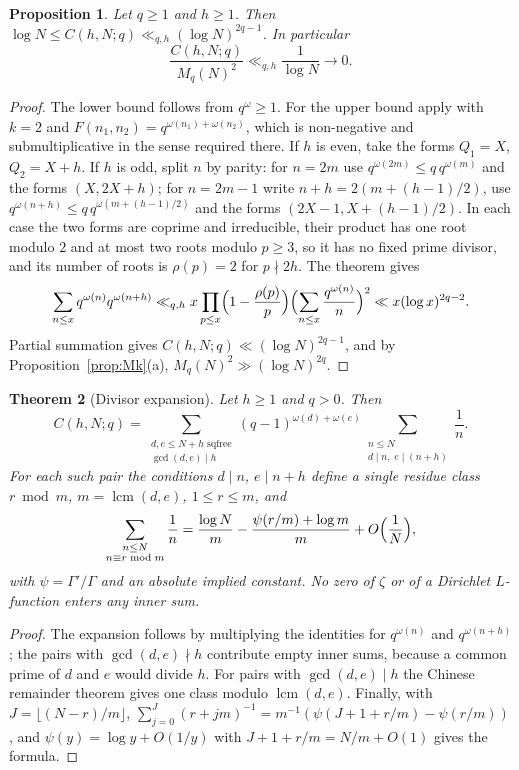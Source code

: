 \documentclass[11pt]{amsart}
\newtheorem{theorem}{Theorem}[section]
\newtheorem{proposition}[theorem]{Proposition}
\theoremstyle{definition}
\theoremstyle{remark}
\newcommand{\om}{\omega}
\begin{document}
\begin{proposition}\label{prop:limit}
  Let $q\ge1$ and $h\ge1$.  Then $\log N\le C(h,N;q)\ll_{q,h}(\log N)^{2q-1}$.  In particular
  \[
    \frac{C(h,N;q)}{M_q(N)^2}\ll_{q,h}\frac1{\log N}\longrightarrow0 .
  \]
\end{proposition}
\begin{proof}
  The lower bound follows from $q^{\om}\ge1$.  For the upper bound apply
  \cite[Thm.~1]{NT98} with $k=2$ and $F(n_1,n_2)=q^{\om(n_1)+\om(n_2)}$, which is
  non-negative and submultiplicative in the sense required there.  If $h$ is even, take the
  forms $Q_1=X$, $Q_2=X+h$.  If $h$ is odd, split $n$ by parity: for $n=2m$ use
  $q^{\om(2m)}\le q\,q^{\om(m)}$ and the forms $(X,2X+h)$; for $n=2m-1$ write
  $n+h=2(m+(h-1)/2)$, use $q^{\om(n+h)}\le q\,q^{\om(m+(h-1)/2)}$ and the forms
  $(2X-1,X+(h-1)/2)$.  In each case the two forms are coprime and irreducible, their product
  has one root modulo $2$ and at most two roots modulo $p\ge3$, so it has no fixed prime
  divisor, and its number of roots is $\rho(p)=2$ for $p\nmid2h$.  The theorem gives
  \[
    \sum_{n\le x}q^{\om(n)}q^{\om(n+h)}\ll_{q,h} x\prod_{p\le x}\Bigl(1-\frac{\rho(p)}p\Bigr)
    \Bigl(\sum_{n\le x}\frac{q^{\om(n)}}{n}\Bigr)^2\ll x(\log x)^{2q-2}.
  \]
  Partial summation gives $C(h,N;q)\ll(\log N)^{2q-1}$, and by
  Proposition~\ref{prop:Mk}(a), $M_q(N)^2\gg(\log N)^{2q}$.
\end{proof}

\begin{theorem}[Divisor expansion]\label{thm:error}
  Let $h\ge1$ and $q>0$.  Then
  \begin{equation}\label{eq:Aq}
    C(h,N;q) = \sum_{\substack{d,e\le N+h\text{ sqfree}\\\gcd(d,e)\mid h}}
               (q-1)^{\om(d)+\om(e)}
               \!\!\!\sum_{\substack{n\le N\\d\mid n,\;e\mid(n+h)}}\!\!\!\frac{1}{n}.
  \end{equation}
  For each such pair the conditions $d\mid n$, $e\mid n+h$ define a single residue class
  $r\bmod m$, $m=\operatorname{lcm}(d,e)$, $1\le r\le m$, and
  \[
    \sum_{\substack{n\le N\\n\equiv r\bmod m}}\frac1n
    =\frac{\log N}{m}-\frac{\psi(r/m)+\log m}{m}+O\Bigl(\frac1N\Bigr),
  \]
  with $\psi=\Gamma'/\Gamma$ and an absolute implied constant.  No zero of $\zeta$ or of a
  Dirichlet $L$-function enters any inner sum.
\end{theorem}
\begin{proof}
  The expansion follows by multiplying the identities for $q^{\om(n)}$ and $q^{\om(n+h)}$;
  the pairs with $\gcd(d,e)\nmid h$ contribute empty inner sums, because a common prime of
  $d$ and $e$ would divide $h$.  For pairs with $\gcd(d,e)\mid h$ the Chinese remainder
  theorem gives one class modulo $\operatorname{lcm}(d,e)$.  Finally, with $J=\lfloor(N-r)/m\rfloor$,
  $\sum_{j=0}^{J}(r+jm)^{-1}=m^{-1}(\psi(J+1+r/m)-\psi(r/m))$, and
  $\psi(y)=\log y+O(1/y)$ with $J+1+r/m=N/m+O(1)$ gives the formula.
\end{proof}
\end{document}
